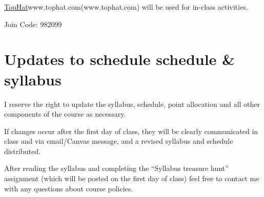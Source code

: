 \documentclass[
]{book}
\begin{document}
\protect\hyperlink{tophat}{TopHat}www.tophat.com(www.tophat.com) will be used for in-class activities.

Join Code: 982099

\hypertarget{updates-to-schedule-schedule-syllabus}{%
\chapter{Updates to schedule schedule \& syllabus}\label{updates-to-schedule-schedule-syllabus}}

I reserve the right to update the syllabus, schedule, point allocation and all other components of the course as necessary.

If changes occur after the first day of class, they will be clearly communicated in class and via email/Canvas message, and a revised syllabus and schedule distributed.

After reading the syllabus and completing the ``Syllabus treasure hunt'' assignment (which will be posted on the first day of class) feel free to contact me with any questions about course policies.

  
\end{document}
